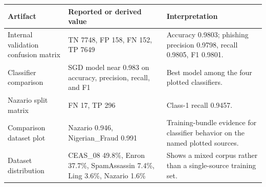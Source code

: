 \begin{table}[!htbp]
\centering
\footnotesize
\begin{tabular}{|>{\raggedright\arraybackslash}p{}|>{\raggedright\arraybackslash}p{}|>{\raggedright\arraybackslash}p{}|}
\hline
\textbf{Artifact} & \textbf{Reported or derived value} & \textbf{Interpretation} \\
\hline
Internal validation confusion matrix & TN 7748, FP 158, FN 152, TP 7649 & Accuracy 0.9803; phishing precision 0.9798, recall 0.9805, F1 0.9801. \\
\hline
Classifier comparison & SGD model near 0.983 on accuracy, precision, recall, and F1 & Best model among the four plotted classifiers. \\
\hline
Nazario split matrix & FN 17, TP 296 & Class-1 recall 0.9457. \\
\hline
Comparison dataset plot & Nazario 0.946, Nigerian\_Fraud 0.991 & Training-bundle evidence for classifier behavior on the named plotted sources. \\
\hline
Dataset distribution & CEAS\_08 49.8\%, Enron 37.7\%, SpamAssassin 7.4\%, Ling 3.6\%, Nazario 1.6\% & Shows a mixed corpus rather than a single-source training set. \\
\hline
\end{tabular}
\end{table}
